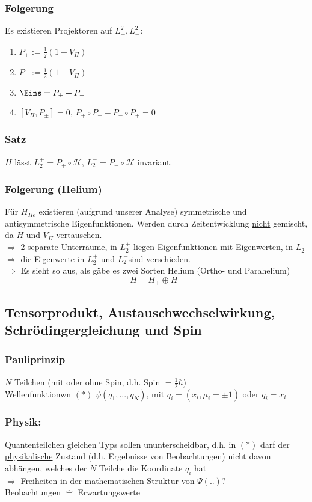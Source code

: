 \documentclass[twoside,a4paper]{scrartcl}
\renewcommand{\1}{\mathds{1}}
\newcommand{\Ra}{\Rightarrow}
\renewcommand{\H}{\mathcal{H}}
\begin{document}
\subsubsection*{Folgerung}
Es existieren Projektoren auf $L_+^2, L_-^2$:
\begin{enumerate}
\item $P_+:=\frac{1}{2}(1+V_\Pi)$
\item $P_-:=\frac{1}{2}(1-V_\Pi)$
\item $\Eins=P_++P_-$
\item $[V_\Pi,P_\pm]=0$, $P_+\circ P_- - P_- \circ P_+=0$
\end{enumerate}
\subsubsection*{Satz}
$H$ lässt $L_2^+=P_+ \circ \H$, $L_2^-=P_- \circ \H$ invariant.
\subsubsection*{Folgerung (Helium)}
Für $H_{He}$ existieren (aufgrund unserer Analyse) symmetrische und antisymmetrische Eigenfunktionen. Werden durch Zeitentwicklung \underline{nicht} gemischt, da $H$ und $V_\Pi$ vertauschen.\\
$\Ra$ 2 separate Unterräume, in $L_2^+$ liegen Eigenfunktionen mit Eigenwerten, in $L_2^-$\\
$\Ra$ die Eigenwerte in $L_2^+$ und $L_2^-$sind verschieden.\\
$\Ra$ Es sieht so aus, als gäbe es zwei Sorten Helium (Ortho- und Parahelium)\\
$$H=H_+ \oplus H_-$$



\subsection{Tensorprodukt, Austauschwechselwirkung, Schrödingergleichung und Spin}
\subsubsection*{Pauliprinzip}
$N$ Teilchen (mit oder ohne Spin, d.h. Spin $=\frac{1}{2}\hbar$)\\
Wellenfunktionwn $(*)$ $\psi(q_1,...,q_N)$, mit $q_i=(x_i,\mu_i=\pm 1)$ oder $q_i=x_i$
\subsubsection*{Physik:}
Quantenteilchen gleichen Typs sollen ununterscheidbar, d.h. in $(*)$ darf der \underline{physikalische} Zustand (d.h. Ergebnisse von Beobachtungen) nicht davon abhängen, welches der $N$ Teilche die Koordinate $q_i$ hat \\
$\Ra$ \underline{Freiheiten} in der mathematischen Struktur von $\Psi(..)$?\\
Beobachtungen $\mathrel{\widehat{=}}$ Erwartungswerte\\
\end{document}
